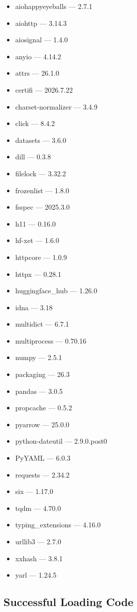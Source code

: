 \documentclass[11pt]{article}
\begin{document}
\begin{itemize}
    \item aiohappyeyeballs --- 2.7.1
    \item aiohttp --- 3.14.3
    \item aiosignal --- 1.4.0
    \item anyio --- 4.14.2
    \item attrs --- 26.1.0
    \item certifi --- 2026.7.22
    \item charset-normalizer --- 3.4.9
    \item click --- 8.4.2
    \item datasets --- 3.6.0
    \item dill --- 0.3.8
    \item filelock --- 3.32.2
    \item frozenlist --- 1.8.0
    \item fsspec --- 2025.3.0
    \item h11 --- 0.16.0
    \item hf-xet --- 1.6.0
    \item httpcore --- 1.0.9
    \item httpx --- 0.28.1
    \item huggingface\_hub --- 1.26.0
    \item idna --- 3.18
    \item multidict --- 6.7.1
    \item multiprocess --- 0.70.16
    \item numpy --- 2.5.1
    \item packaging --- 26.3
    \item pandas --- 3.0.5
    \item propcache --- 0.5.2
    \item pyarrow --- 25.0.0
    \item python-dateutil --- 2.9.0.post0
    \item PyYAML --- 6.0.3
    \item requests --- 2.34.2
    \item six --- 1.17.0
    \item tqdm --- 4.70.0
    \item typing\_extensions --- 4.16.0
    \item urllib3 --- 2.7.0
    \item xxhash --- 3.8.1
    \item yarl --- 1.24.5
\end{itemize}

\subsection{Successful Loading Code}
\end{document}
